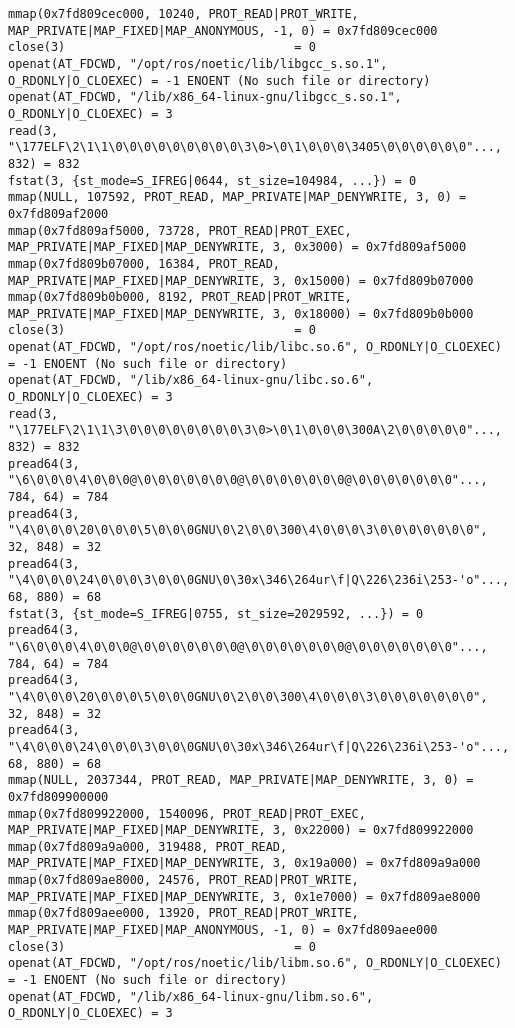 \documentclass[a4paper, 14pt]{article}
\begin{document}
\begin{lstlisting}
mmap(0x7fd809cec000, 10240, PROT_READ|PROT_WRITE, MAP_PRIVATE|MAP_FIXED|MAP_ANONYMOUS, -1, 0) = 0x7fd809cec000
close(3)                                = 0
openat(AT_FDCWD, "/opt/ros/noetic/lib/libgcc_s.so.1", O_RDONLY|O_CLOEXEC) = -1 ENOENT (No such file or directory)
openat(AT_FDCWD, "/lib/x86_64-linux-gnu/libgcc_s.so.1", O_RDONLY|O_CLOEXEC) = 3
read(3, "\177ELF\2\1\1\0\0\0\0\0\0\0\0\0\3\0>\0\1\0\0\0\3405\0\0\0\0\0\0"..., 832) = 832
fstat(3, {st_mode=S_IFREG|0644, st_size=104984, ...}) = 0
mmap(NULL, 107592, PROT_READ, MAP_PRIVATE|MAP_DENYWRITE, 3, 0) = 0x7fd809af2000
mmap(0x7fd809af5000, 73728, PROT_READ|PROT_EXEC, MAP_PRIVATE|MAP_FIXED|MAP_DENYWRITE, 3, 0x3000) = 0x7fd809af5000
mmap(0x7fd809b07000, 16384, PROT_READ, MAP_PRIVATE|MAP_FIXED|MAP_DENYWRITE, 3, 0x15000) = 0x7fd809b07000
mmap(0x7fd809b0b000, 8192, PROT_READ|PROT_WRITE, MAP_PRIVATE|MAP_FIXED|MAP_DENYWRITE, 3, 0x18000) = 0x7fd809b0b000
close(3)                                = 0
openat(AT_FDCWD, "/opt/ros/noetic/lib/libc.so.6", O_RDONLY|O_CLOEXEC) = -1 ENOENT (No such file or directory)
openat(AT_FDCWD, "/lib/x86_64-linux-gnu/libc.so.6", O_RDONLY|O_CLOEXEC) = 3
read(3, "\177ELF\2\1\1\3\0\0\0\0\0\0\0\0\3\0>\0\1\0\0\0\300A\2\0\0\0\0\0"..., 832) = 832
pread64(3, "\6\0\0\0\4\0\0\0@\0\0\0\0\0\0\0@\0\0\0\0\0\0\0@\0\0\0\0\0\0\0"..., 784, 64) = 784
pread64(3, "\4\0\0\0\20\0\0\0\5\0\0\0GNU\0\2\0\0\300\4\0\0\0\3\0\0\0\0\0\0\0", 32, 848) = 32
pread64(3, "\4\0\0\0\24\0\0\0\3\0\0\0GNU\0\30x\346\264ur\f|Q\226\236i\253-'o"..., 68, 880) = 68
fstat(3, {st_mode=S_IFREG|0755, st_size=2029592, ...}) = 0
pread64(3, "\6\0\0\0\4\0\0\0@\0\0\0\0\0\0\0@\0\0\0\0\0\0\0@\0\0\0\0\0\0\0"..., 784, 64) = 784
pread64(3, "\4\0\0\0\20\0\0\0\5\0\0\0GNU\0\2\0\0\300\4\0\0\0\3\0\0\0\0\0\0\0", 32, 848) = 32
pread64(3, "\4\0\0\0\24\0\0\0\3\0\0\0GNU\0\30x\346\264ur\f|Q\226\236i\253-'o"..., 68, 880) = 68
mmap(NULL, 2037344, PROT_READ, MAP_PRIVATE|MAP_DENYWRITE, 3, 0) = 0x7fd809900000
mmap(0x7fd809922000, 1540096, PROT_READ|PROT_EXEC, MAP_PRIVATE|MAP_FIXED|MAP_DENYWRITE, 3, 0x22000) = 0x7fd809922000
mmap(0x7fd809a9a000, 319488, PROT_READ, MAP_PRIVATE|MAP_FIXED|MAP_DENYWRITE, 3, 0x19a000) = 0x7fd809a9a000
mmap(0x7fd809ae8000, 24576, PROT_READ|PROT_WRITE, MAP_PRIVATE|MAP_FIXED|MAP_DENYWRITE, 3, 0x1e7000) = 0x7fd809ae8000
mmap(0x7fd809aee000, 13920, PROT_READ|PROT_WRITE, MAP_PRIVATE|MAP_FIXED|MAP_ANONYMOUS, -1, 0) = 0x7fd809aee000
close(3)                                = 0
openat(AT_FDCWD, "/opt/ros/noetic/lib/libm.so.6", O_RDONLY|O_CLOEXEC) = -1 ENOENT (No such file or directory)
openat(AT_FDCWD, "/lib/x86_64-linux-gnu/libm.so.6", O_RDONLY|O_CLOEXEC) = 3

\end{lstlisting}
\end{document}
